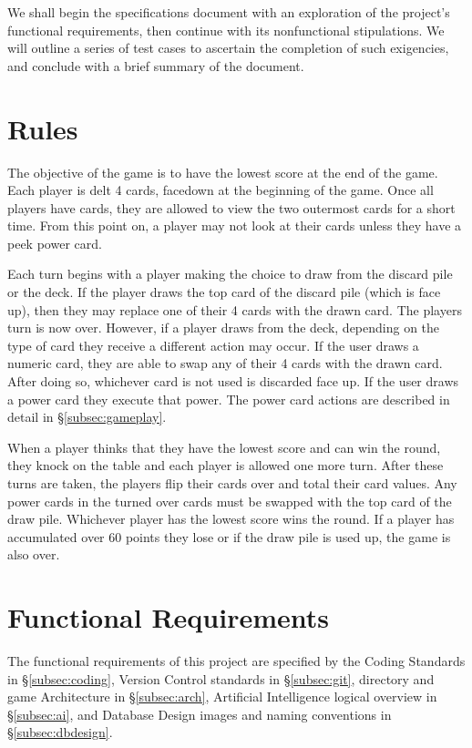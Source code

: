 \documentclass[12pt]{IEEEtran}
\begin{document}
	We shall begin the specifications document with an exploration of the project’s functional requirements, then continue with its nonfunctional stipulations. We will outline a series of test cases to ascertain the completion of such exigencies, and conclude with a brief summary of the document.

\section{Rules}
\label{sec:rules}

	The objective of the game is to have the lowest score at the end of the game. Each player is delt 4 cards, facedown at the beginning of the game. Once all players have cards, they are allowed to view the two outermost cards for a short time. From this point on, a player may not look at their cards unless they have a peek power card. 

	Each turn begins with a player making the choice to draw from the discard pile or the deck. If the player draws the top card of the discard pile (which is face up), then they may replace one of their 4 cards with the drawn card. The players turn is now over. However, if a player draws from the deck, depending on the type of card they receive a different action may occur. If the user draws a numeric card, they are able to swap any of their 4 cards with the drawn card. After doing so, whichever card is not used is discarded face up. If the user draws a power card they execute that power. The power card actions are described in detail in \S\ref{subsec:gameplay}. 

	When a player thinks that they have the lowest score and can win the round, they knock on the table and each player is allowed one more turn. After these turns are taken, the players flip their cards over and total their card values. Any power cards in the turned over cards  must be swapped with the top card of the draw pile. Whichever player has the lowest score wins the round. If a player has accumulated over 60 points they lose or if the draw pile is used up, the game is also over.

\section{Functional Requirements}
\label{sec:funcReq}
	The functional requirements of this project are specified by the Coding Standards in \S \ref{subsec:coding}, Version 			Control standards in \S \ref{subsec:git}, directory and game Architecture in \S 	\ref{subsec:arch}, Artificial Intelligence 		logical overview in \S \ref{subsec:ai}, and Database Design images and naming conventions in \S\ref{subsec:dbdesign}.
\end{document}
